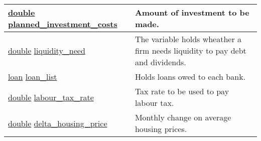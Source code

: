 \documentclass[a4paper,11pt]{article}
\begin{document}
\begin{longtable}[H!]{ll}
\midrule
\parbox{5cm}{\url{double} \url{planned_investment_costs}}  & \parbox{10cm}{Amount of investment to be made.} \\
\midrule
\parbox{5cm}{\url{double} \url{liquidity_need}}  & \parbox{10cm}{The variable holds wheather a firm needs liquidity to pay debt and dividends.} \\
\midrule
\parbox{5cm}{\url{loan} \url{loan_list}}  & \parbox{10cm}{Holds loans owed to each bank.} \\
\midrule
\parbox{5cm}{\url{double} \url{labour_tax_rate}}  & \parbox{10cm}{Tax rate to be used to pay labour tax.} \\
\midrule
\parbox{5cm}{\url{double} \url{delta_housing_price}}  & \parbox{10cm}{Monthly change on average housing prices.} \\
\end{longtable}
\end{document}

